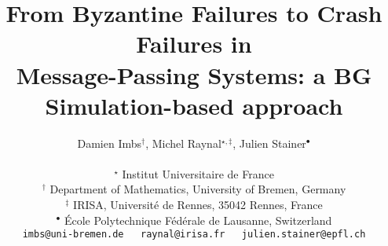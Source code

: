 \documentclass[11pt,letterpaper]{article}
\begin{document}
\title{\bf From Byzantine Failures to Crash Failures in\\ 
             Message-Passing Systems: 
            a BG Simulation-based approach}
\author{Damien Imbs$^{\dag}$,     Michel Raynal$^{\star,\ddag}$, Julien Stainer$^{\bullet}$\\~\\
$^{\star}$ Institut Universitaire de France\\
$^{\dag}$ Department of Mathematics, University of Bremen, Germany\\
$^{\ddag}$ IRISA, Université de Rennes, 35042 Rennes, France \\
$^{\bullet}$ École Polytechnique Fédérale de Lausanne, Switzerland\\
{\footnotesize {\tt
imbs@uni-bremen.de~~~raynal@irisa.fr~~~julien.stainer@epfl.ch
}}
}

\date{}
\maketitle
\end{document}
